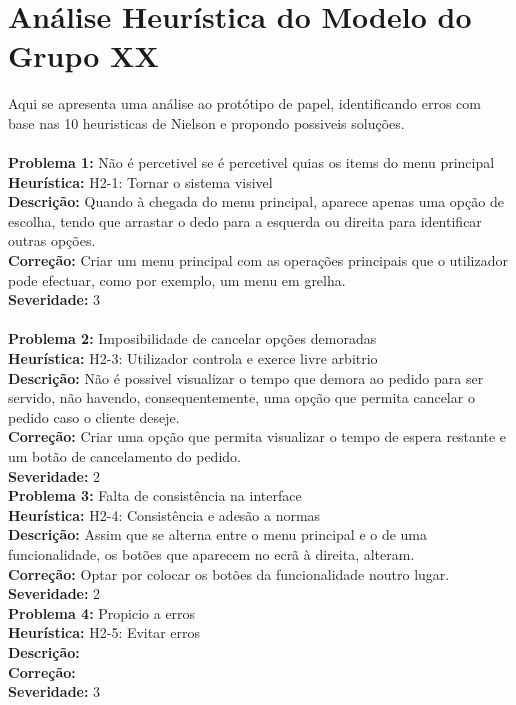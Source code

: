 \documentclass{article}
\begin{document}
\section*{Análise Heurística do Modelo do Grupo XX}
Aqui se apresenta uma análise ao protótipo de papel, identificando erros com base nas 10 heuristicas de Nielson e propondo possiveis soluções.\\
\\
\textbf{Problema 1:} Não é percetivel se é percetivel quias os items do menu principal\\
\textbf{Heurística:} H2-1: Tornar o sistema visivel\\
\textbf{Descrição:} Quando à chegada do menu principal, aparece apenas uma opção de escolha, tendo que arrastar o dedo para a esquerda ou direita para identificar outras opções.\\
\textbf{Correção:} Criar um menu principal com as operações principais que o utilizador pode efectuar, como por exemplo, um menu em grelha.\\
\textbf{Severidade:} 3\\
\\
\textbf{Problema 2:} Imposibilidade de cancelar opções demoradas \\
\textbf{Heurística:} H2-3: Utilizador controla e exerce livre arbitrio\\
\textbf{Descrição:} Não é possivel visualizar o tempo que demora ao pedido para ser servido, não havendo, consequentemente, uma opção que permita cancelar o pedido caso o cliente deseje.\\
\textbf{Correção:} Criar uma opção que permita visualizar o tempo de espera restante e um botão de cancelamento do pedido.\\
\textbf{Severidade:} 2\\


\textbf{Problema 3:} Falta de consistência na interface \\
\textbf{Heurística:} H2-4: Consistência e adesão a normas\\
\textbf{Descrição:} Assim que se alterna entre o menu principal e o de uma funcionalidade, os botões que aparecem no ecrã à direita, alteram.\\
\textbf{Correção:} Optar por colocar os botões da funcionalidade noutro lugar.\\
\textbf{Severidade:} 2\\


\textbf{Problema 4:} Propicio a erros\\
\textbf{Heurística:} H2-5: Evitar erros\\
\textbf{Descrição:}   \\
\textbf{Correção:}  \\
\textbf{Severidade:} 3\\
\end{document}
